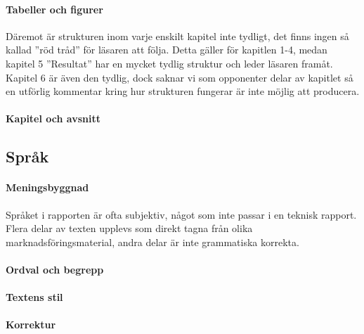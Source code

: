     \paragraph{Tabeller och figurer}

    
        Däremot är strukturen inom varje enskilt kapitel inte tydligt, det finns ingen så kallad ''röd tråd'' för läsaren att följa. Detta gäller för kapitlen 1-4, medan kapitel 5 ''Resultat'' har en mycket tydlig struktur och leder läsaren framåt. Kapitel 6 är även den tydlig, dock saknar vi som opponenter delar av kapitlet så en utförlig kommentar kring hur strukturen fungerar är inte möjlig att producera.
    
    \paragraph{Kapitel och avsnitt}


    \subsection{Språk} %
    \label{sub:sprak}

    \paragraph{Meningsbyggnad}
        Språket i rapporten är ofta subjektiv, något som inte passar i en teknisk rapport. Flera delar av texten upplevs som direkt tagna från olika marknadsföringsmaterial, andra delar är inte grammatiska korrekta.

    \paragraph{Ordval och begrepp}

    \paragraph{Textens stil}

    \paragraph{Korrektur}


